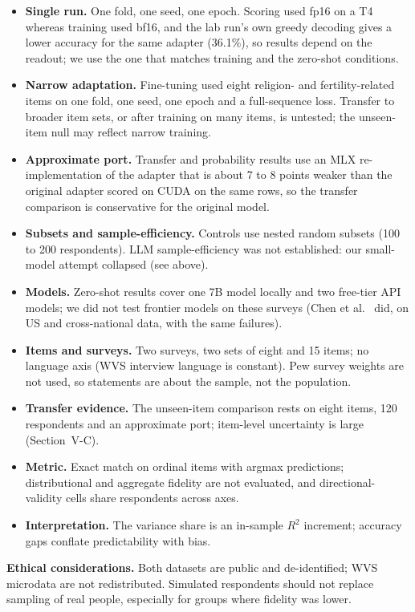 \documentclass[conference]{IEEEtran}
\begin{document}
\begin{itemize}
    \item \textbf{Single run.} One fold, one seed, one epoch. Scoring used fp16 on a T4 whereas training used bf16, and the lab run's own greedy decoding gives a lower accuracy for the same adapter (36.1\%), so results depend on the readout; we use the one that matches training and the zero-shot conditions.
    \item \textbf{Narrow adaptation.} Fine-tuning used eight religion- and fertility-related items on one fold, one seed, one epoch and a full-sequence loss. Transfer to broader item sets, or after training on many items, is untested; the unseen-item null may reflect narrow training.
    \item \textbf{Approximate port.} Transfer and probability results use an MLX re-implementation of the adapter that is about 7 to 8 points weaker than the original adapter scored on CUDA on the same rows, so the transfer comparison is conservative for the original model.
    \item \textbf{Subsets and sample-efficiency.} Controls use nested random subsets (100 to 200 respondents). LLM sample-efficiency was not established: our small-model attempt collapsed (see above).
    \item \textbf{Models.} Zero-shot results cover one 7B model locally and two free-tier API models; we did not test frontier models on these surveys (Chen et al.~\cite{chen2026} did, on US and cross-national data, with the same failures).
    \item \textbf{Items and surveys.} Two surveys, two sets of eight and 15 items; no language axis (WVS interview language is constant). Pew survey weights are not used, so statements are about the sample, not the population.
    \item \textbf{Transfer evidence.} The unseen-item comparison rests on eight items, 120 respondents and an approximate port; item-level uncertainty is large (Section~V-C).
    \item \textbf{Metric.} Exact match on ordinal items with argmax predictions; distributional and aggregate fidelity are not evaluated, and directional-validity cells share respondents across axes.
    \item \textbf{Interpretation.} The variance share is an in-sample $R^2$ increment; accuracy gaps conflate predictability with bias.
\end{itemize}

\textbf{Ethical considerations.} Both datasets are public and de-identified; WVS microdata are not redistributed. Simulated respondents should not replace sampling of real people, especially for groups where fidelity was lower.
\end{document}
